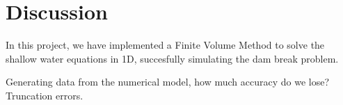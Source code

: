 \chapter{Discussion}\label{ch:discussion}
In this project, we have implemented a Finite Volume Method to solve the shallow water equations in 1D, succesfully simulating the dam break problem.

Generating data from the numerical model, how much accuracy do we lose?
Truncation errors.




